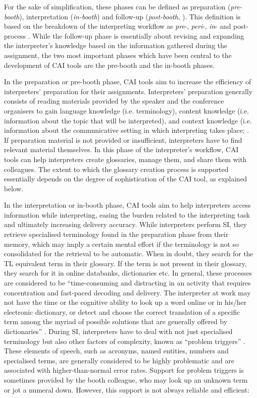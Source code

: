 For the sake of simplification, these phases can be defined as preparation (\textit{pre-booth}), interpretation (\textit{in-booth}) and follow-up (\textit{post-booth}, \citealt{eabm2021a}). This definition is based on the breakdown of the interpreting workflow as \textit{pre}-, \mbox{\textit{peri}-}, \textit{in}- and post-process \citep{kalina2000interpreting}. While the follow-up phase is essentially about revising and expanding the interpreter’s knowledge based on the information gathered during the assignment, the two most important phases which have been central to the development of CAI tools are the pre-booth and the in-booth phases.

In the preparation or pre-booth phase, CAI tools aim to increase the efficiency of interpreters’ preparation for their assignments. Interpreters’ preparation generally consists of reading materials provided by the speaker and the conference organisers to gain language knowledge (i.e. terminology), content knowledge (i.e. information about the topic that will be interpreted), and context knowledge (i.e. information about the communicative setting in which interpreting takes place; \citep{rutten2007informations}. If preparation material is not provided or insufficient, interpreters have to find relevant material themselves. In this phase of the interpreter’s workflow, CAI tools can help interpreters create glossaries, manage them, and share them with colleagues. The extent to which the glossary creation process is supported essentially depends on the degree of sophistication of the CAI tool, as explained below.

In the interpretation or in-booth phase, CAI tools aim to help interpreters access information while interpreting, easing the burden related to the interpreting task and ultimately increasing delivery accuracy. While interpreters perform SI, they retrieve specialised terminology found in the preparation phase from their memory, which may imply a certain mental effort if the terminology is not so consolidated for the retrieval to be automatic. When in doubt, they search for the TL equivalent term in their glossary. If the term is not present in their glossary, they search for it in online databanks, dictionaries etc. In general, these processes are considered to be ``time-consuming and distracting in an activity that requires concentration and fast-paced decoding and delivery. The interpreter at work may not have the time or the cognitive ability to look up a word online or in his/her electronic dictionary, or detect and choose the correct translation of a specific term among the myriad of possible solutions that are generally offered by dictionaries'' \citep[90]{tripepi2010usefulness}. During SI, interpreters have to deal with not just specialised terminology but also other factors of complexity, known as ``problem triggers'' \citep{gile2009basic}. These elements of speech, such as acronyms, named entities, numbers and specialised terms, are generally considered to be highly problematic and are associated with higher-than-normal error rates. Support for problem triggers is sometimes provided by the booth colleague, who may look up an unknown term or jot a numeral down. However, this support is not always reliable and efficient:

